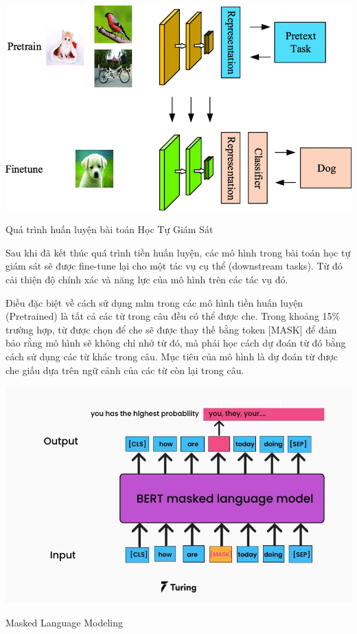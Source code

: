 \documentclass[a4paper, 12pt, openany]{book}
\begin{document}
\begin{minipage}{\linewidth}
    \captionsetup{type=figure}
    \centering
    \includegraphics[width=1\linewidth]{./assets/images/self-supervised.png}
    \caption{Quá trình huấn luyện bài toán Học Tự Giám Sát}
\end{minipage}

\vspace{0.5cm}

Sau khi đã kết thúc quá trình tiền huấn luyện, các mô hình trong bài toán học tự giám sát sẽ được
fine-tune lại cho một tác vụ cụ thể (downstream tasks). Từ đó cải thiện độ chính xác và năng lực của mô hình
trên các tác vụ đó.

Điều đặc biệt về cách sử dụng \ac{mlm} trong các mô hình tiền huấn luyện (Pretrained) là tất cả các từ trong câu đều có
thể được che. Trong khoảng 15\% trường hợp, từ được chọn để che sẽ được thay thế bằng token
[MASK] để đảm bảo rằng mô hình sẽ không chỉ nhớ từ đó, mà phải học cách dự đoán từ
đó bằng cách sử dụng các từ khác trong câu. Mục tiêu của mô hình là dự đoán từ được che giấu dựa trên ngữ cảnh của các từ còn lại trong câu.

\begin{minipage}{\linewidth}
    \captionsetup{type=figure}
    \centering
    \includegraphics[width=\linewidth]{./assets/images/mllm.png}
    \caption{Masked Language Modeling\cite{mlm}}
\end{minipage}
\vspace{0.5cm}
\end{document}
